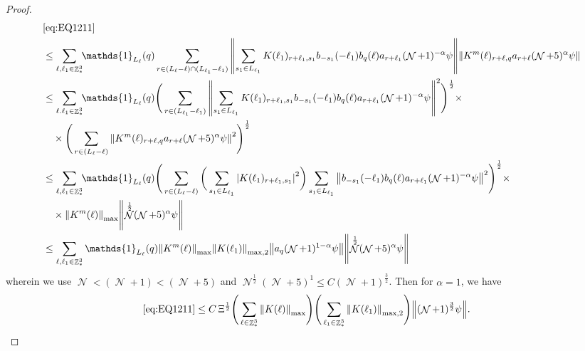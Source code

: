 \documentclass[sn-mathphys, Numbered ,a4paper]{sn-jnl}%
\DeclareMathOperator{\Z}{\mathbb{Z}}
\DeclareMathOperator{\NN}{\mathcal{N}}
\newcommand{\half}{\frac{1}{2}}
\theoremstyle{plain}
\theoremstyle{definition}
\theoremstyle{remark}
\theoremstyle{plain}
\theoremstyle{definition}
\theoremstyle{remark}
\begin{document}
{\begin{proof}
\begin{align}
	&\eqref{eq:EQ1211}\nonumber\\
	&\leq\sum\limits_{\ell,\ell_1 \in \Z^3_*} \!\!\mathds{1}_{L_\ell}(q) \sum\limits_{ r \in (L_\ell-\ell) \cap (L_{\ell_1}-\ell_1)}    \norm{\sum\limits_{s_1 \in L_{\ell_1}} K(\ell_1)_{r+\ell_1,s_1} b_{-s_1}(-\ell_1) b_{q}(\ell) a_{r+\ell_1} (\NN+1)^{-\alpha}\psi}\norm{  K^{m}(\ell)_{r+\ell,q}  a_{r+\ell} (\NN+5)^{\alpha}\psi } \nonumber\\
	&\leq \sum\limits_{\ell.\ell_1 \in \Z^3_*} \!\!\mathds{1}_{L_\ell}(q) \Bigg( \sum\limits_{r \in (L_{\ell_1}-\ell_1)} \norm{\sum\limits_{s_1 \in L_{\ell_1}} K(\ell_1)_{r+\ell_1,s_1} b_{-s_1}(-\ell_1) b_{q}(\ell) a_{r+\ell_1} (\NN+1)^{-\alpha}\psi}^2\Bigg)^\half \times\nonumber\\
	&\quad \times \Bigg( \sum\limits_{r \in (L_\ell-\ell)}  \norm{  K^{m}(\ell)_{r+\ell,q}  a_{r+\ell} (\NN+5)^{\alpha}\psi }^2\Bigg)^\half \nonumber\\
	&\leq \sum\limits_{\ell,\ell_1 \in \Z^3_*} \!\!\mathds{1}_{L_\ell}(q) \Bigg( \sum\limits_{r \in (L_\ell-\ell)} \bigg( \sum\limits_{s_1 \in L_{\ell_1}}\abs{K(\ell_1)_{r+\ell_1,s_1}}^2\bigg) \sum\limits_{s_1 \in L_{\ell_1}} \norm{ b_{-s_1}(-\ell_1) b_{q}(\ell) a_{r+\ell_1} (\NN+1)^{-\alpha}\psi}^2\Bigg)^\half \times\nonumber\\
	&\quad \times  \norm{  K^{m}(\ell)}_{\mathrm{max}} \norm{ \NN^\half(\NN+5)^{\alpha}\psi } \nonumber\\
	&\leq \sum\limits_{\ell ,\ell_1\in \Z^3_*}\mathds{1}_{L_\ell}(q) \norm{  K^{m}(\ell)}_{\mathrm{max}}   \norm{K(\ell_1)}_{\mathrm{max,2}}  \norm{   a_{q}(\NN+1)^{1-\alpha}\psi} \norm{ \NN^\half (\NN+5)^{\alpha}\psi } \nonumber\\
\end{align}
wherein we use $\NN<(\NN+1)<(\NN+5)$ and $\NN^\half(\NN+5)^1\leq C(\NN+1)^{\frac{3}{2}}$. Then for $\alpha = 1$, we have
\begin{align}
	\eqref{eq:EQ1211}&\leq C\, \Xi^\half \Bigg( \sum\limits_{\ell \in \Z^3_*} \norm{K(\ell)}_{\mathrm{max}} \Bigg) \Bigg( \sum\limits_{\ell_1 \in \Z^3_*}\norm{K(\ell_1)}_{\mathrm{max,2}} \Bigg)  \norm { (\NN+1)^{\frac{3}{2}} \psi }. \label{eq:estEQ1211}    

\end{align}
\end{proof}}
\end{document}

